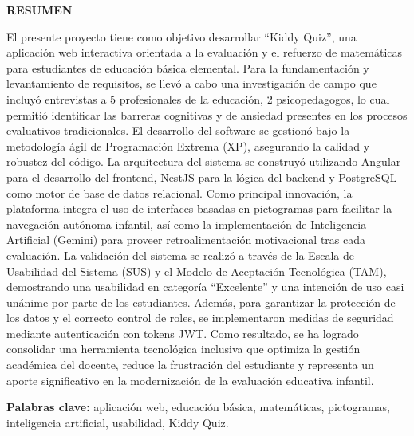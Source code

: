 \begin{center}
    \vspace*{0.5cm}
    {\bfseries RESUMEN}
\end{center}
\vspace{0.8cm}

\justifying
El presente proyecto tiene como objetivo desarrollar ``Kiddy Quiz'', una aplicación web interactiva orientada a la evaluación y el refuerzo de matemáticas para estudiantes de educación básica elemental. Para la fundamentación y levantamiento de requisitos, se llevó a cabo una investigación de campo que incluyó entrevistas a 5 profesionales de la educación, 2 psicopedagogos, lo cual permitió identificar las barreras cognitivas y de ansiedad presentes en los procesos evaluativos tradicionales. El desarrollo del software se gestionó bajo la metodología ágil de Programación Extrema (XP), asegurando la calidad y robustez del código. La arquitectura del sistema se construyó utilizando Angular para el desarrollo del frontend, NestJS para la lógica del backend y PostgreSQL como motor de base de datos relacional. Como principal innovación, la plataforma integra el uso de interfaces basadas en pictogramas para facilitar la navegación autónoma infantil, así como la implementación de Inteligencia Artificial (Gemini) para proveer retroalimentación motivacional tras cada evaluación. La validación del sistema se realizó a través de la Escala de Usabilidad del Sistema (SUS) y el Modelo de Aceptación Tecnológica (TAM), demostrando una usabilidad en categoría ``Excelente'' y una intención de uso casi unánime por parte de los estudiantes. Además, para garantizar la protección de los datos y el correcto control de roles, se implementaron medidas de seguridad mediante autenticación con tokens JWT. Como resultado, se ha logrado consolidar una herramienta tecnológica inclusiva que optimiza la gestión académica del docente, reduce la frustración del estudiante y representa un aporte significativo en la modernización de la evaluación educativa infantil.

\vspace{0.5cm}

\noindent\textbf{Palabras clave:} aplicación web, educación básica, matemáticas, pictogramas, inteligencia artificial, usabilidad, Kiddy Quiz.

\newpage
